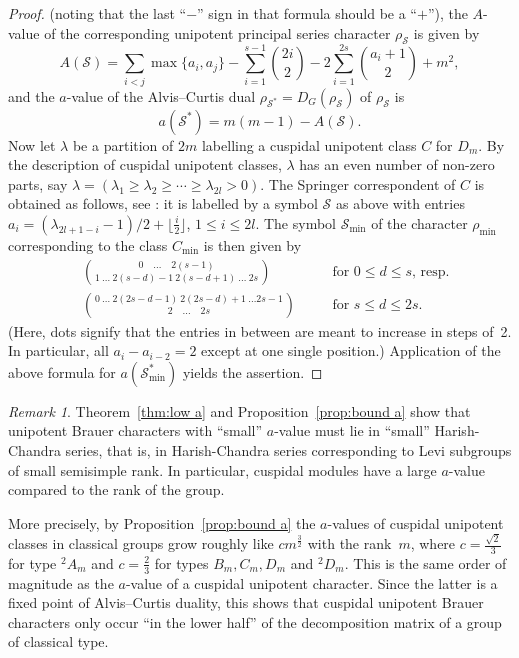 \documentclass[12pt,leqno,a4paper]{amsart}
\newcommand{\cS}{{\mathcal{S}}}
\newcommand{\mi}{{\operatorname{min}}}
\newcommand{\tw}[1]{{}^{#1}\!}
\let\la=\lambda
\theoremstyle{remark}
\newtheorem{rem}[thm]{Remark}
\begin{document}
\begin{proof}
(noting that the last ``$-$'' sign in that formula should be a ``$+$''),
the $A$-value of the corresponding unipotent principal series character
$\rho_\cS$ is given by
$$A(\cS)=\sum_{i<j}\max\{a_i,a_j\}-\sum_{i=1}^{s-1}\binom{2i}{2}
  -2\sum_{i=1}^{2s}\binom{a_i+1}{2}+m^2,$$
and the $a$-value of the Alvis--Curtis dual $\rho_{\cS^*}=D_G(\rho_\cS)$ of
$\rho_\cS$ is
$$a(\cS^*)=m(m-1)-A(\cS).$$
Now let $\la$ be a partition of $2m$ labelling a cuspidal unipotent class $C$
for $D_m$. By the description of cuspidal unipotent classes, $\la$ has an even
number of non-zero parts, say $\la=(\la_1\ge\la_2\ge\cdots\ge\la_{2l}>0)$. The
Springer correspondent of $C$ is obtained as follows, see \cite[\S2D]{GM00}:
it is labelled by a symbol $\cS$ as above with entries
$a_i=(\la_{2l+1-i}-1)/2+\lfloor\frac{i}{2}\rfloor$, $1\le i\le 2l$. The symbol
$\cS_\mi$ of the character $\rho_\mi$ corresponding to the class $C_\mi$ is
then given by
$$\begin{aligned}
  &\binom{0\quad \ldots\quad 2(s-1)}{1\ \ldots\ 2(s-d)-1\ 2(s-d+1)\ \ldots\ 2s}&
  \quad &\text{for $0\le d\le s$, resp.}\\
  &\binom{0\ \ldots\ 2(2s-d-1)\ 2(2s-d)+1\ \ldots 2s-1}{2\quad \ldots\quad 2s}&
  \quad &\text{for $s\le d\le 2s$}.
\end{aligned}$$
(Here, dots signify that the entries in between are meant to increase in steps
of~2. In particular, all $a_i-a_{i-2}=2$ except at one single position.)
Application of the above formula for $a(\cS_\mi^*)$ yields the assertion.
\end{proof}

\begin{rem}
Theorem~\ref{thm:low a} and Proposition~\ref{prop:bound a} show that unipotent
Brauer characters with ``small'' $a$-value must lie in ``small'' Harish-Chandra
series, that is, in Harish-Chandra series corresponding to Levi subgroups of
small semisimple rank. In particular, cuspidal modules have a large $a$-value
compared to the rank of the group. \par
More precisely, by Proposition~\ref{prop:bound a} the $a$-values of cuspidal
unipotent classes in classical groups grow roughly like $c m^{\frac{3}{2}}$
with the rank~$m$, where $c=\frac{\sqrt{2}}{3}$ for type $\tw2A_m$ and
$c=\frac{2}{3}$ for types $B_m,C_m,D_m$ and $\tw2D_m$. This is the same order
of magnitude as the $a$-value of a cuspidal unipotent character. Since the
latter is a fixed point of Alvis--Curtis duality, this shows that cuspidal
unipotent Brauer characters only occur ``in the lower half'' of the
decomposition matrix of a group of classical type.
\end{rem}
\end{document}
